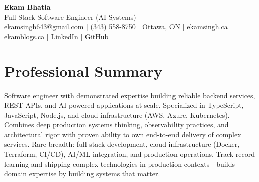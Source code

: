 \documentclass[11pt,a4paper]{article}
\begin{document}
\begin{center}
    {\LARGE \textbf{Ekam Bhatia}} \\
    \vspace{2pt}
    {\normalsize Full-Stack Software Engineer (AI Systems) } \\
    \vspace{4pt}
    \small
    \href{mailto:ekamsingh643@gmail.com}{ekamsingh643@gmail.com} $|$
    (343) 558-8750 $|$ Ottawa, ON $|$
    \href{https://www.ekamsingh.ca}{ekamsingh.ca} $|$
    \href{https://www.ekamblogs.ca}{ekamblogs.ca} $|$
    \href{https://www.linkedin.com/in/ekam-bhatia-335840168}{LinkedIn} $|$
    \href{https://github.com/bhat0155}{GitHub}
\end{center}

\section{Professional Summary}
Software engineer with demonstrated expertise building reliable backend services, REST APIs, and AI-powered applications at scale. Specialized in TypeScript, JavaScript, Node.js, and cloud infrastructure (AWS, Azure, Kubernetes). Combines deep production systems thinking, observability practices, and architectural rigor with proven ability to own end-to-end delivery of complex services. Rare breadth: full-stack development, cloud infrastructure (Docker, Terraform, CI/CD), AI/ML integration, and production operations. Track record learning and shipping complex technologies in production contexts—builds domain expertise by building systems that matter.

\end{document}
